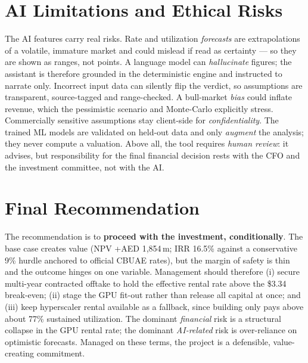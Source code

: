 \documentclass[12pt,a4paper]{article}
\begin{document}
\section{AI Limitations and Ethical Risks}
The AI features carry real risks. Rate and utilization \emph{forecasts} are extrapolations of a
volatile, immature market and could mislead if read as certainty --- so they are shown as ranges,
not points. A language model can \emph{hallucinate} figures; the assistant is therefore grounded
in the deterministic engine and instructed to narrate only. Incorrect input data can silently flip
the verdict, so assumptions are transparent, source-tagged and range-checked. A bull-market
\emph{bias} could inflate revenue, which the pessimistic scenario and Monte-Carlo explicitly
stress. Commercially sensitive assumptions stay client-side for \emph{confidentiality}. The trained
ML models are validated on held-out data and only \emph{augment} the analysis; they never compute a
valuation. Above all, the tool requires \emph{human review}: it advises, but responsibility for the
final financial decision rests with the CFO and the investment committee, not with the AI.

\section{Final Recommendation}
The recommendation is to \textbf{proceed with the investment, conditionally}. The base case
creates value (NPV +AED 1{,}854\,m; IRR 16.5\% against a conservative 9\% hurdle anchored to
official CBUAE rates), but the margin of safety is thin and the outcome hinges on one variable.
Management should therefore (i) secure multi-year contracted offtake to hold the effective rental
rate above the \$3.34 break-even; (ii) stage the GPU fit-out rather than release all capital at
once; and (iii) keep hyperscaler rental available as a fallback, since building only pays above
about 77\% sustained utilization. The dominant \emph{financial} risk is a structural collapse in
the GPU rental rate; the dominant \emph{AI-related} risk is over-reliance on optimistic forecasts.
Managed on these terms, the project is a defensible, value-creating commitment.
\end{document}
